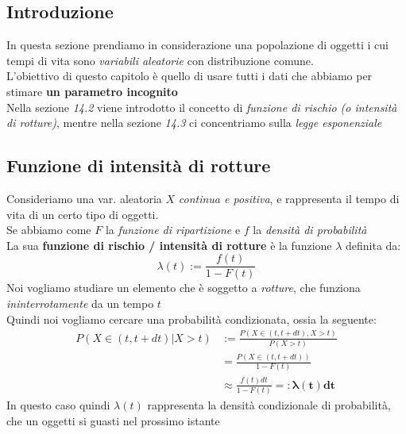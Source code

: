 \documentclass[]{article}
\begin{document}
    \subsection{Introduzione}
    In questa sezione prendiamo in considerazione una popolazione di oggetti i cui tempi di vita sono \textit{variabili aleatorie} con distribuzione comune. \\
    L'obiettivo di questo capitolo è quello di usare tutti i dati che abbiamo per stimare \textbf{un parametro incognito} \\
    Nella sezione \textit{14.2} viene introdotto il concetto di \textit{funzione di rischio (o intensità di rotture)}, mentre nella sezione \textit{14.3} ci concentriamo sulla \textit{legge esponenziale}
    \subsection{Funzione di intensità di rotture}
    Consideriamo una var. aleatoria $X$ \textit{continua e positiva}, e rappresenta il tempo di vita di un certo tipo di oggetti. \\
    Se abbiamo come $F$ la \textit{funzione di ripartizione} e $f$ la \textit{densità di probabilità} \\
    La sua \textbf{funzione di rischio / intensità di rotture} è la funzione $\lambda$ definita da:
    \[ \lambda(t) := \frac{f(t)}{1 - F(t)} \]
    Noi vogliamo studiare un elemento che è soggetto a \textit{rotture}, che funziona \textit{ininterrotamente} da un tempo $t$ \\
    Quindi noi vogliamo cercare una probabilità condizionata, ossia la seguente:
    \begin{equation*}
        \begin{split}
            P(X \in (t, t+ dt) | X > t) &:= \frac{P(X \in (t,t+dt), X > t)}{P(X>t)} \\
            &= \frac{P(X \in (t,t+dt))}{1 -F(t)} \\
            &\approx \frac{f(t) dt}{1-F(t)} =: \boldsymbol{\lambda(t) dt}
        \end{split}
    \end{equation*}
    In questo caso quindi $\lambda(t)$ rappresenta la densità condizionale di probabilità, che un oggetti si guasti nel prossimo istante
\end{document}
